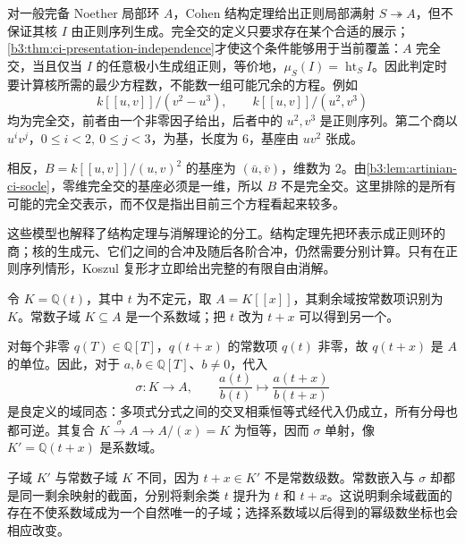 对一般完备 Noether 局部环 \(A\)，Cohen 结构定理给出正则局部满射 \(S\twoheadrightarrow A\)，但不保证其核 \(I\) 由正则序列生成。完全交的定义只要求存在某个合适的展示；\cref{b3:thm:ci-presentation-independence}才使这个条件能够用于当前覆盖：\(A\) 完全交，当且仅当 \(I\) 的任意极小生成组正则，等价地，\(\mu_S(I)=\operatorname{ht}_SI\)。因此判定时要计算核所需的最少方程数，不能数一组可能冗余的方程。例如
\[
	k[\![u,v]\!]/(v^2-u^3),\qquad k[\![u,v]\!]/(u^2,v^3)
\]
均为完全交，前者由一个非零因子给出，后者中的 \(u^2,v^3\) 是正则序列。第二个商以 \(u^iv^j\)，\(0\le i<2,\ 0\le j<3\)，为基，长度为 \(6\)，基座由 \(uv^2\) 张成。

\ProseParagraphBreak
相反，\(B=k[\![u,v]\!]/(u,v)^2\) 的基座为 \((\bar u,\bar v)\)，维数为 \(2\)。由\cref{b3:lem:artinian-ci-socle}，零维完全交的基座必须是一维，所以 \(B\) 不是完全交。这里排除的是所有可能的完全交表示，而不仅是指出目前三个方程看起来较多。

\ProseParagraphBreak
这些模型也解释了结构定理与消解理论的分工。结构定理先把环表示成正则环的商；核的生成元、它们之间的合冲及随后各阶合冲，仍然需要分别计算。只有在正则序列情形，Koszul 复形才立即给出完整的有限自由消解。

\begin{example}\label{b3:exm:coefficient-field-nonunique}
	令 \(K=\mathbb Q(t)\)，其中 \(t\) 为不定元，取 \(A=K[\![x]\!]\)，其剩余域按常数项识别为 \(K\)。常数子域 \(K\subseteq A\) 是一个系数域；把 \(t\) 改为 \(t+x\) 可以得到另一个。

	\ProseParagraphBreak
	对每个非零 \(q(T)\in\mathbb Q[T]\)，\(q(t+x)\) 的常数项 \(q(t)\) 非零，故 \(q(t+x)\) 是 \(A\) 的单位。因此，对于 \(a,b\in\mathbb Q[T]\)、\(b\ne0\)，代入
	\[
		\sigma:K\longrightarrow A, \qquad \frac{a(t)}{b(t)}\longmapsto \frac{a(t+x)}{b(t+x)}
	\]
	是良定义的域同态：多项式分式之间的交叉相乘恒等式经代入仍成立，所有分母也都可逆。其复合 \(K\xrightarrow{\sigma}A\to A/(x)=K\) 为恒等，因而 \(\sigma\) 单射，像 \(K'=\mathbb Q(t+x)\) 是系数域。

	\ProseParagraphBreak
	子域 \(K'\) 与常数子域 \(K\) 不同，因为 \(t+x\in K'\) 不是常数级数。常数嵌入与 \(\sigma\) 却都是同一剩余映射的截面，分别将剩余类 \(t\) 提升为 \(t\) 和 \(t+x\)。这说明剩余域截面的存在不使系数域成为一个自然唯一的子域；选择系数域以后得到的幂级数坐标也会相应改变。
\end{example}

